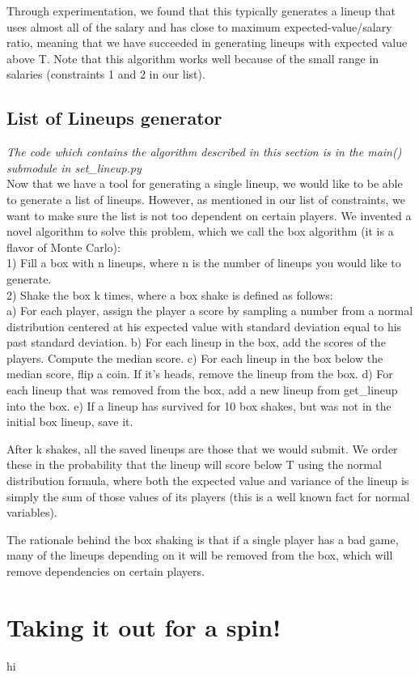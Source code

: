 \documentclass[12pt]{article}
\renewcommand{\=}[1]{\stackrel{#1}{=}} %
\theoremstyle{definition}
\begin{document}
Through experimentation, we found that this typically generates a lineup that uses almost all of the salary and has close to maximum expected-value/salary ratio, meaning that we have succeeded in generating lineups with expected value above T. Note that this algorithm works well because of the small range in salaries (constraints 1 and 2 in our list).  

\subsection{List of Lineups generator}
\label{lge}
\emph{The code which contains the algorithm described in this section is in the main() submodule in set\_lineup.py} \\

Now that we have a tool for generating a single lineup, we would like to be able to generate a list of lineups. However, as mentioned in our list of constraints, we want to make sure the list is not too dependent on certain players.  We invented a novel algorithm to solve this problem, which we call the box algorithm (it is a flavor of Monte Carlo):\\

1) Fill a box with n lineups, where n is the number of lineups you would like to generate.  \\
2) Shake the box k times, where a box shake is defined as follows: \\
a) For each player, assign the player a score by sampling a number from a normal distribution centered at his expected value with standard deviation equal to his past standard deviation.  
b) For each lineup in the box, add the scores of the players. Compute the median score.
c) For each lineup in the box below the median score, flip a coin.  If it's heads, remove the lineup from the box.  
d) For each lineup that was removed from the box, add a new lineup from get\_lineup into the box.
e) If a lineup has survived for 10 box shakes, but was not in the initial box lineup, save it.

After k shakes, all the saved lineups are those that we would submit.  We order these in the probability that the lineup will score below T using the normal distribution formula, where both the expected value and variance of the lineup is simply the sum of those values of its players (this is a well known fact for normal variables).  

The rationale behind the box shaking is that if a single player has a bad game, many of the lineups depending on it will be removed from the box, which will remove dependencies on certain players.  

\section{Taking it out for a spin!}
\label{ga}
hi
 
\end{document}
